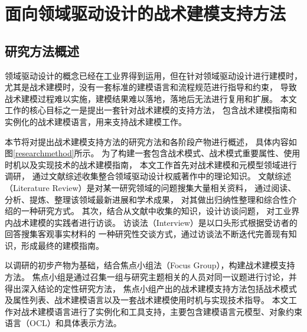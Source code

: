 \chapter{面向领域驱动设计的战术建模支持方法}

\section{研究方法概述}

领域驱动设计的概念已经在工业界得到运用，但在针对领域驱动设计进行建模时，
尤其是战术建模时，没有一套标准的建模语言和流程规范进行指导和约束，
导致战术建模过程难以实施，建模结果难以落地，落地后无法进行复用和扩展。
本文工作的核心目标之一是提出一套针对战术建模的支持方法，
包含战术建模指南和实例化的战术建模语言，用来支持战术建模工作。

本节将对提出战术建模支持方法的研究方法和各阶段产物进行概述，
具体内容如图\ref{researchmethod}所示。
为了构建一套包含战术模式、战术模式重要属性、使用时机以及实现技术的战术建模指南，
本文工作首先对战术建模和元模型领域进行调研，
通过文献综述收集整合领域驱动设计权威著作中的理论知识。
文献综述（Literature Review）是对某一研究领域的问题搜集大量相关资料，
通过阅读、分析、提炼、整理该领域最新进展和学术成果，
对其做出归纳性整理和综合性介绍的一种研究方式。
其次，结合从文献中收集的知识，设计访谈问题，
对工业界内战术建模的实践者进行访谈。
访谈法（Interview）是以口头形式根据受访者的回答搜集客观事实材料的
一种研究性交谈方式，通过访谈法不断迭代完善现有知识，形成最终的建模指南。

以调研的初步产物为基础，结合焦点小组法（Focus Group）\cite{fattahi2018focus}，构建战术建模支持方法。
焦点小组是通过召集一组与研究主题相关的人员对同一议题进行讨论，并得出深入结论的定性研究方法，
焦点小组产出的战术建模支持方法包括战术模式及属性列表、战术建模语言以及一套战术建模使用时机与实现技术指导。
本文工作对战术建模语言进行了实例化和工具支持，主要包含建模语言元模型、对象约束语言（OCL）和具体表示方法。


